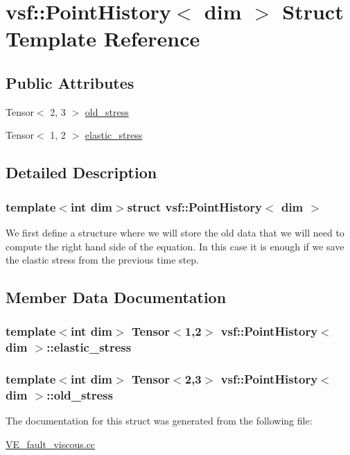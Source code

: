 \hypertarget{structvsf_1_1PointHistory}{\section{vsf\-:\-:Point\-History$<$ dim $>$ Struct Template Reference}
\label{structvsf_1_1PointHistory}
}
\subsection*{Public Attributes}
\begin{DoxyCompactItemize}
\item 
Tensor$<$ 2, 3 $>$ \hyperlink{structvsf_1_1PointHistory_af104d4345ce885e7392264be43262504}{old\-\_\-stress}
\item 
Tensor$<$ 1, 2 $>$ \hyperlink{structvsf_1_1PointHistory_ae475ec0684d70235a27c6a1136e28fd7}{elastic\-\_\-stress}
\end{DoxyCompactItemize}


\subsection{Detailed Description}
\subsubsection*{template$<$int dim$>$struct vsf\-::\-Point\-History$<$ dim $>$}

We first define a structure where we will store the old data that we will need to compute the right hand side of the equation. In this case it is enough if we save the elastic stress from the previous time step. 

\subsection{Member Data Documentation}
\hypertarget{structvsf_1_1PointHistory_ae475ec0684d70235a27c6a1136e28fd7}{
\subsubsection[{elastic\-\_\-stress}]{\setlength{\rightskip}{0pt plus 5cm}template$<$int dim$>$ Tensor$<$1,2$>$ {\bf vsf\-::\-Point\-History}$<$ dim $>$\-::elastic\-\_\-stress}}\label{structvsf_1_1PointHistory_ae475ec0684d70235a27c6a1136e28fd7}
\hypertarget{structvsf_1_1PointHistory_af104d4345ce885e7392264be43262504}{
\subsubsection[{old\-\_\-stress}]{\setlength{\rightskip}{0pt plus 5cm}template$<$int dim$>$ Tensor$<$2,3$>$ {\bf vsf\-::\-Point\-History}$<$ dim $>$\-::old\-\_\-stress}}\label{structvsf_1_1PointHistory_af104d4345ce885e7392264be43262504}


The documentation for this struct was generated from the following file\-:\begin{DoxyCompactItemize}
\item 
\hyperlink{VE__fault__viscous_8cc}{V\-E\-\_\-fault\-\_\-viscous.\-cc}\end{DoxyCompactItemize}
